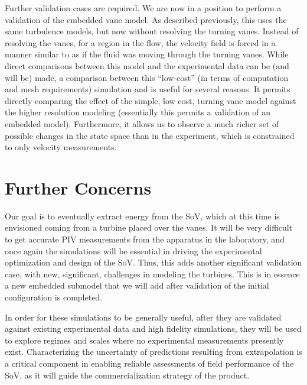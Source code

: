 \documentclass{article}
\begin{document}
%
%
Further validation cases are required. We are now in a position to perform
a validation of the embedded vane model. As described previously, this
uses the same turbulence models, but now without resolving the turning
vanes. Instead of resolving the vanes, for a region in the flow, the
velocity field is forced in a manner similar to as if the fluid was
moving through the turning vanes. While direct comparisons between this
model and the experimental data can be (and will be) made, a comparison between this
``low-cost'' (in terms of computation and mesh requirements) simulation
and is useful for several reasons. It permits directly comparing the effect of
the simple, low cost, turning vane model against the higher resolution
modeling (essentially this permits a validation of an embedded
model). Furthermore, it allows us to observe a much richer set of
possible changes in the state space than in the experiment, which is
constrained to only velocity measurements. 

%
%
\section{Further Concerns}

Our goal is to eventually extract energy from the SoV, which at this
time is envisioned coming from a turbine placed over the vanes. It will
be very difficult to get accurate PIV measurements from the apparatus in
the laboratory, and once again the simulations will be essential in
driving the experimental optimization and design of the SoV. Thus, 
this adds another significant validation case, with new, significant,
challenges in modeling the turbines. This is in essence a new embedded
submodel that we will add after validation of the initial configuration
is completed. 

In order for these simulations to be generally useful, after they are 
validated against existing experimental data and high fidelity
simulations, they will be used to explore regimes and scales where no
experimental measurements presently exist. Characterizing the
uncertainty of predictions resulting from extrapolation is a critical
component in enabling reliable assessments of field performance of the
SoV, as it will guide the commercialization strategy of the product.
\end{document}
